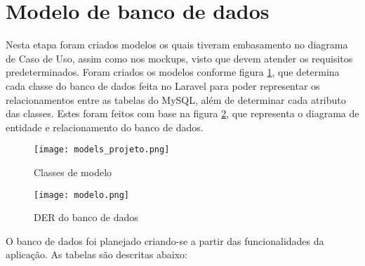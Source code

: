 \section{Modelo de banco de dados}
Nesta etapa foram criados modelos os quais tiveram embasamento no diagrama de Caso de Uso, assim como nos mockups, visto que devem atender os requisitos predeterminados. Foram criados os modelos conforme figura \ref{models_projeto}, que determina cada classe do banco de dados feita no Laravel para poder representar os relacionamentos entre as tabelas do MySQL, além de determinar cada atributo das classes. Estes foram feitos com base na figura \ref{modelo_banco}, que representa o diagrama de entidade e relacionamento do banco de dados.
\begin{figure}[H]
    \caption{\label{models_projeto}Classes de modelo}
    \vspace{5pt}
    \centering
    \texttt{[image: models\_projeto.png]}
    \vspace{5pt}
\end{figure}
\begin{figure}[htbp]
    \caption{\label{modelo_banco}DER do banco de dados}
    \vspace{5pt}
    \centering
    \texttt{[image: modelo.png]}
    \vspace{5pt}
\end{figure}
O banco de dados foi planejado criando-se a partir das funcionalidades da aplicação. As tabelas são descritas abaixo:
